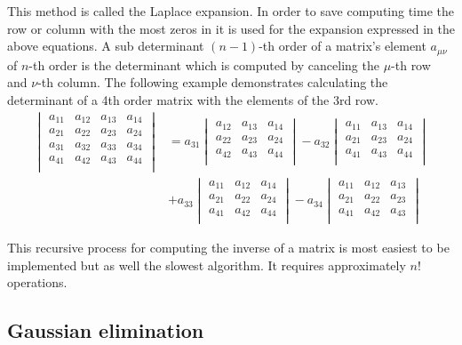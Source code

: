 \documentclass[10pt]{report}
\begin{document}
This method is called the Laplace expansion.  In order to save
computing time the row or column with the most zeros in it is used for
the expansion expressed in the above equations.  A sub determinant
$(n-1)$-th order of a matrix's element $a_{\mu\nu}$ of $n$-th order is
the determinant which is computed by canceling the $\mu$-th row and
$\nu$-th column.  The following example demonstrates calculating the
determinant of a 4th order matrix with the elements of the 3rd row.
\begin{align}
\begin{vmatrix}
a_{11} & a_{12} & a_{13} & a_{14}\\
a_{21} & a_{22} & a_{23} & a_{24}\\
a_{31} & a_{32} & a_{33} & a_{34}\\
a_{41} & a_{42} & a_{43} & a_{44}\\
\end{vmatrix}
&= a_{31}
\begin{vmatrix}
a_{12} & a_{13} & a_{14}\\
a_{22} & a_{23} & a_{24}\\
a_{42} & a_{43} & a_{44}\\
\end{vmatrix}
- a_{32}
\begin{vmatrix}
a_{11} & a_{13} & a_{14}\\
a_{21} & a_{23} & a_{24}\\
a_{41} & a_{43} & a_{44}\\
\end{vmatrix}\\
\nonumber
&+ a_{33}
\begin{vmatrix}
a_{11} & a_{12} & a_{14}\\
a_{21} & a_{22} & a_{24}\\
a_{41} & a_{42} & a_{44}\\
\end{vmatrix}
- a_{34}
\begin{vmatrix}
a_{11} & a_{12} & a_{13}\\
a_{21} & a_{22} & a_{23}\\
a_{41} & a_{42} & a_{43}\\
\end{vmatrix}
\end{align}

This recursive process for computing the inverse of a matrix is most
easiest to be implemented but as well the slowest algorithm.  It
requires approximately $n!$ operations.

\subsection{Gaussian elimination}
\end{document}
